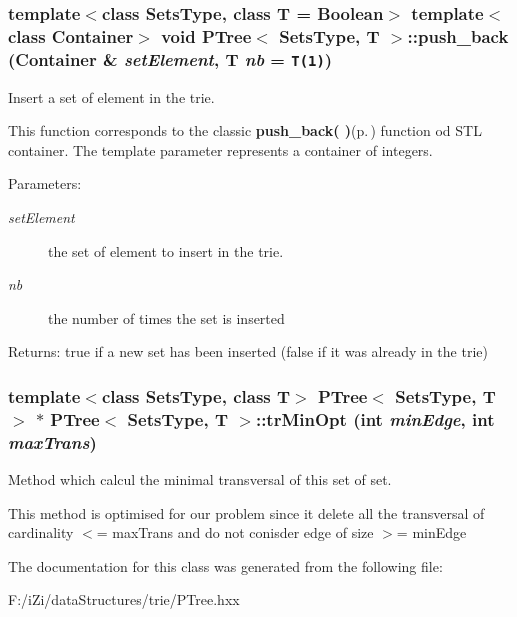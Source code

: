 \subsubsection{\setlength{\rightskip}{0pt plus 5cm}template$<$class Sets\-Type, class T = Boolean$>$ template$<$class Container$>$ void {\bf PTree}$<$ Sets\-Type, T $>$::push\_\-back (Container \& {\em set\-Element}, T {\em nb} = {\tt T(1)})\hspace{0.3cm}{\tt  [inline]}}\label{class_p_tree_a00717d40a6aa709644759370ccb0382}


Insert a set of element in the trie. 

This function corresponds to the classic {\bf push\_\-back( )}{\rm (p.\,\pageref{class_p_tree_a00717d40a6aa709644759370ccb0382})} function od STL container. The template parameter represents a container of integers. \begin{Desc}
\item[Parameters:]
\begin{description}
\item[{\em set\-Element}]the set of element to insert in the trie. \item[{\em nb}]the number of times the set is inserted \end{description}
\end{Desc}
\begin{Desc}
\item[Returns:]true if a new set has been inserted (false if it was already in the trie) \end{Desc}
\subsubsection{\setlength{\rightskip}{0pt plus 5cm}template$<$class Sets\-Type, class T$>$ {\bf PTree}$<$ Sets\-Type, T $>$ $\ast$ {\bf PTree}$<$ Sets\-Type, T $>$::tr\-Min\-Opt (int {\em min\-Edge}, int {\em max\-Trans})}\label{class_p_tree_a3a65704846f2afb0005ec7b08f300ce}


Method which calcul the minimal transversal of this set of set. 

This method is optimised for our problem since it delete all the transversal of cardinality $<$= max\-Trans and do not conisder edge of size $>$= min\-Edge 

The documentation for this class was generated from the following file:\begin{CompactItemize}
\item 
F:/i\-Zi/data\-Structures/trie/PTree.hxx\end{CompactItemize}
